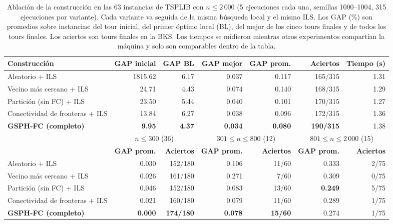 \documentclass[runningheads]{llncs}
\begin{document}
\begin{table}
\caption{Ablación de la construcción en las 63 instancias de TSPLIB con
$n\le 2\,000$ (5 ejecuciones cada una, semillas 1000--1004, 315
ejecuciones por variante). Cada variante va seguida de la misma búsqueda
local y el mismo ILS. Los GAP (\%) son promedios sobre instancias: del
tour inicial, del primer óptimo local (BL), del mejor de los cinco tours
finales y de todos los tours finales. Los aciertos son tours finales en
la BKS. Los tiempos se midieron mientras otros experimentos compartían la
máquina y solo son comparables dentro de la tabla.}
\label{tab:ablation-constr}
\centering\scriptsize
\begin{tabular}{@{}lrrrrrr@{}}
\toprule
\textbf{Construcción} & \textbf{GAP inicial} & \textbf{GAP BL} & \textbf{GAP mejor} & \textbf{GAP prom.} & \textbf{Aciertos} & \textbf{Tiempo (s)}\\
\midrule
Aleatorio + ILS                  & 1815.62 & 6.17 & 0.037 & 0.117 & 165/315 & 1.31 \\
Vecino más cercano + ILS         &   24.71 & 4.43 & 0.074 & 0.140 & 168/315 & 1.29 \\
Partición (sin FC) + ILS         &   23.50 & 5.44 & 0.040 & 0.101 & 170/315 & 1.27 \\
Conectividad de fronteras + ILS  &   13.84 & 6.27 & 0.038 & 0.096 & 172/315 & 1.36 \\
\textbf{GSPH-FC (completo)}      & \textbf{9.95} & \textbf{4.37} & \textbf{0.034} & \textbf{0.080} & \textbf{190/315} & 1.38 \\
\midrule
& \multicolumn{2}{c}{$n\le 300$ (36)} & \multicolumn{2}{c}{$301\le n\le 800$ (12)} & \multicolumn{2}{c}{$801\le n\le 2\,000$ (15)}\\
\cmidrule(lr){2-3}\cmidrule(lr){4-5}\cmidrule(lr){6-7}
& \textbf{GAP prom.} & \textbf{Aciertos} & \textbf{GAP prom.} & \textbf{Aciertos} & \textbf{GAP prom.} & \textbf{Aciertos}\\
\midrule
Aleatorio + ILS                  & 0.030 & 152/180 & 0.106 & 11/60 & 0.333 & 2/75 \\
Vecino más cercano + ILS         & 0.026 & 161/180 & 0.271 &  7/60 & 0.309 & 0/75 \\
Partición (sin FC) + ILS         & 0.046 & 152/180 & 0.083 & 13/60 & \textbf{0.249} & 5/75 \\
Conectividad de fronteras + ILS  & 0.021 & 160/180 & 0.079 & 11/60 & 0.289 & 1/75 \\
\textbf{GSPH-FC (completo)}      & \textbf{0.000} & \textbf{174/180} & \textbf{0.078} & \textbf{15/60} & 0.274 & 1/75 \\
\bottomrule
\end{tabular}
\end{table}
\end{document}
